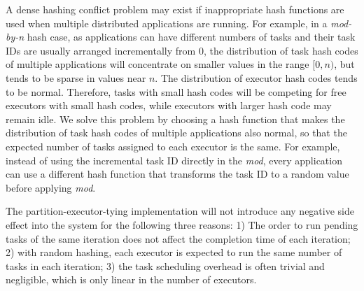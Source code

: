 \documentclass[10pt,journal,compsoc]{IEEEtran}
\begin{document}
A dense hashing conflict problem may exist if inappropriate hash
functions are used when multiple distributed applications are running.
For example, in a \emph{mod-by-n} hash case, as applications can have
different numbers of tasks and their task IDs are usually arranged
incrementally from 0, the distribution of task hash codes of multiple
applications will concentrate on smaller values in the range $[0, n)$, but
tends to be sparse in values near $n$. The distribution of executor
hash codes tends to be normal. Therefore, tasks with small hash codes
will be competing for free executors with small hash codes, while
executors with larger hash code may remain idle. We solve this problem
by choosing a hash function that makes the distribution of task hash
codes of multiple applications also normal, so that the expected number of
tasks assigned to each executor is the same. For example, instead of
using the incremental task ID directly in the \emph{mod}, every application
can use a different hash function that transforms the task ID to a
random value before applying \emph{mod}. 

The partition-executor-tying implementation will not introduce any negative
side effect into the system for the following three reasons: 1)  The
order to run pending tasks of the same iteration does not affect the
completion time of each iteration; 2) with random hashing, each executor
is expected to run the same number of tasks in each iteration;
3) the task scheduling overhead is often trivial and negligible, which
is only linear in the number of executors.
\end{document}

